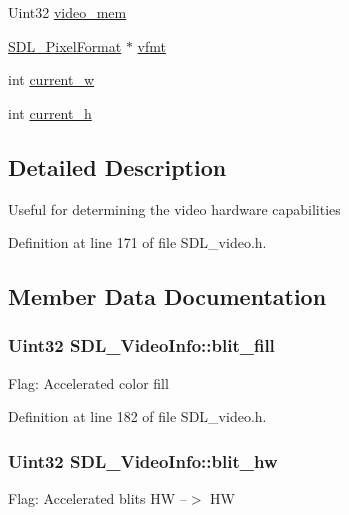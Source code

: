 \begin{DoxyCompactItemize}
\item 
Uint32 \hyperlink{structSDL__VideoInfo_ab706d6c856b170f8da28786e98fb5de3}{video\+\_\+mem}
\item 
\hyperlink{structSDL__PixelFormat}{S\+D\+L\+\_\+\+Pixel\+Format} $\ast$ \hyperlink{structSDL__VideoInfo_a8501500d288bda9c60d8251138478f08}{vfmt}
\item 
int \hyperlink{structSDL__VideoInfo_add58e29175b54818092e9dea416fdc7f}{current\+\_\+w}
\item 
int \hyperlink{structSDL__VideoInfo_ae797099dc83c35aa6fa9a157fee4c120}{current\+\_\+h}
\end{DoxyCompactItemize}


\subsection{Detailed Description}
Useful for determining the video hardware capabilities 

Definition at line 171 of file S\+D\+L\+\_\+video.\+h.



\subsection{Member Data Documentation}
\hypertarget{structSDL__VideoInfo_ab0453880653b45226638e1ee34fceb56}{
\subsubsection[{blit\+\_\+fill}]{\setlength{\rightskip}{0pt plus 5cm}Uint32 S\+D\+L\+\_\+\+Video\+Info\+::blit\+\_\+fill}}\label{structSDL__VideoInfo_ab0453880653b45226638e1ee34fceb56}
Flag\+: Accelerated color fill 

Definition at line 182 of file S\+D\+L\+\_\+video.\+h.

\hypertarget{structSDL__VideoInfo_afd985d7ee038d978694ebe0203338837}{
\subsubsection[{blit\+\_\+hw}]{\setlength{\rightskip}{0pt plus 5cm}Uint32 S\+D\+L\+\_\+\+Video\+Info\+::blit\+\_\+hw}}\label{structSDL__VideoInfo_afd985d7ee038d978694ebe0203338837}
Flag\+: Accelerated blits H\+W --$>$ H\+W 

